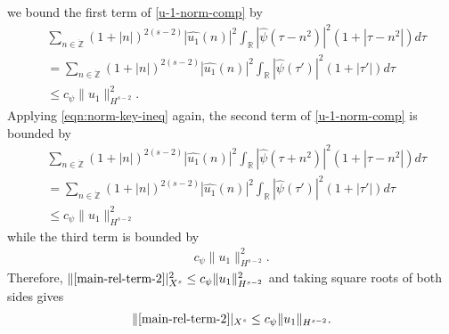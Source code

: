 \documentclass[12pt,reqno]{amsart}
\numberwithin{equation}{section}  %
\newcommand{\rr}{\mathbb{R}}
\newcommand{\zz}{\mathbb{Z}}
\newcommand{\wh}{\widehat}
\begin{document}
we bound the first term of
\eqref{u-1-norm-comp} by
%
%
%
\begin{equation*}
  \begin{split}
    & \sum_{n \in \dot{\zz}} \left( 1 + |n| \right)^{2(s-2)} | \wh{u_{1}}(n)
    |^{2} \int_{\rr} | \wh{\psi}(\tau - n^{2}) |^{2}\left( 1 +  | \tau  -
    n^{2} | \right) d \tau
    \\
    & = \sum_{n \in \dot{\zz}} \left( 1 + |n| \right)^{2(s-2)} | \wh{u_{1}}(n)
    |^{2} \int_{\rr} | \wh{\psi}(\tau') |^{2}\left( 1 +  | \tau'| \right) d \tau
    \\
    & \le c_{\psi} \| u_{1} \|_{H^{s-2}}^{2}. 
  \end{split}
\end{equation*}
%
%
Applying
\eqref{eqn:norm-key-ineq} again, the
second term of \eqref{u-1-norm-comp} is bounded by
\begin{equation*}
  \begin{split}
    & \sum_{n \in \dot{\zz}} \left( 1 + |n| \right)^{2(s-2)} | \wh{u_{1}}(n)
    |^{2} \int_{\rr} | \wh{\psi}(\tau + n^{2}) |^{2}\left( 1 +  | \tau  -
    n^{2} | \right) d \tau
    \\
    & = \sum_{n \in \dot{\zz}} \left( 1 + |n| \right)^{2(s-2)} | \wh{u_{1}}(n)
    |^{2} \int_{\rr} | \wh{\psi}(\tau') |^{2}\left( 1 +  | \tau'| \right) d \tau
    \\
    & \le c_{\psi} \| u_{1} \|_{H^{s-2}}^{2}
  \end{split}
\end{equation*}
while the third term is bounded by  
%
%
\begin{equation*}
\begin{split}
  c_{\psi} \| u_{1} \|_{H^{s-2}}^{2}.
\end{split}
\end{equation*}
%
%
Therefore, 
$\|\eqref{main-rel-term-2}|_{X^{s}}^{2} \le c_{\psi}
\|u_{1}\|_{H^{s-2}}^2$ and
taking square roots of both sides gives
%
%
\begin{equation*}
  \begin{split}
    \|\eqref{main-rel-term-2}|_{X^{s}} \le c_{\psi}
    \|u_{1}\|_{H^{s-2}}.
  \end{split}
\end{equation*}
%
%
%
%
\end{document}
